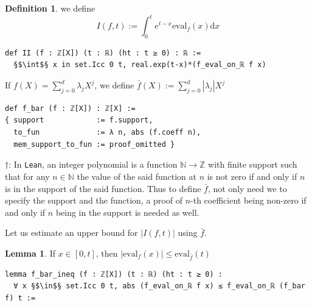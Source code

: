\documentclass{report}
\theoremstyle{definition}
\newtheorem{lemma}{Lemma}[section]
\newtheorem{definition}{Definition}[section]
\begin{document}


\begin{definition}
we define
$$
I(f,t):=\int_0^t e^{t-x}\mathrm{eval}_f(x)\mathrm{d}x
$$

\begin{verbatim}
def II (f : ℤ[X]) (t : ℝ) (ht : t ≥ 0) : ℝ := 
  §$\int$§ x in set.Icc 0 t, real.exp(t-x)*(f_eval_on_ℝ f x) 
\end{verbatim}

If $f(X)=\sum_{j=0}^d\lambda_j X^j$, we define $\bar f(X):=\sum_{j=0}^d\left|\lambda_j\right|X^j$

\begin{verbatim}
def f_bar (f : ℤ[X]) : ℤ[X] :=
{ support            := f.support,
  to_fun             := λ n, abs (f.coeff n),
  mem_support_to_fun := proof_omitted }
\end{verbatim}
$\dagger$: In {\tt Lean}, an integer polynomial is a function $\mathbb N\to\mathbb Z$ with finite support such that for any $n\in\mathbb N$ the value of the said function at $n$ is not zero if and only if $n$ is in the support of the said function. Thus to define $\bar f$, not only need we to specify the support and the function, a proof of $n$-th coefficient being non-zero if and only if $n$ being in the support is needed as well.
\end{definition}

Let us estimate an upper bound for $\left|I(f,t)\right|$ using $\bar f$.

\begin{lemma}\label{lemma:absf}
If $x\in[0,t]$, then $\left|\mathrm{eval}_f(x)\right|\le\mathrm{eval}_{\bar f}(t)$

\begin{verbatim}
lemma f_bar_ineq (f : ℤ[X]) (t : ℝ) (ht : t ≥ 0) : 
  ∀ x §$\in$§ set.Icc 0 t, abs (f_eval_on_ℝ f x) ≤ f_eval_on_ℝ (f_bar f) t :=
\end{verbatim}
\end{lemma}
\end{document}
